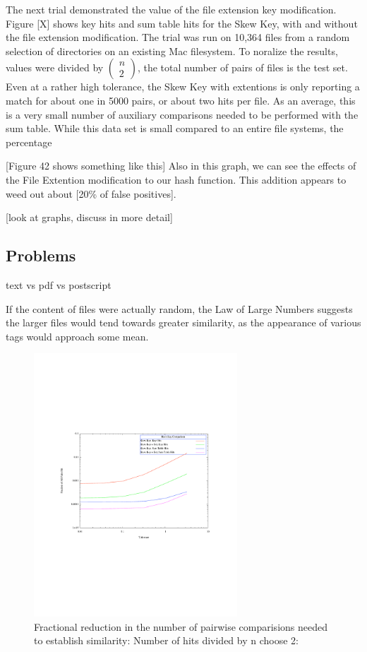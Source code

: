 \documentclass[10pt, twocolumn]{article}
\begin{document}
The next trial demonstrated the value of the file extension key modification.  Figure [X]  shows key hits and sum table hits for the Skew Key, with and without the file extension modification.  The trial was run on 10,364 files from a random selection of directories on an existing Mac filesystem.  To noralize the results, values were divided by $\left( \begin{array}{c} n \\ 2 \end{array} \right)$, the total number of pairs of files is the test set.  Even at a rather high tolerance, the Skew Key with extentions is only reporting a match for about one in 5000 pairs, or about two hits per file.  As an average, this is a very small number of auxiliary comparisons needed to be performed with the sum table.  While this data set is small compared to an entire file systems, the percentage 



 [Figure 42 shows something like this]  Also in this graph, we can see the effects of the File Extention modification to our hash function.  This addition appears to weed out about [20\% of false positives].


[look at graphs, discuss in more detail]




\subsection{Problems}

text vs pdf vs postscript


 If the content of files were actually random, the Law of Large Numbers suggests the larger files would tend towards greater similarity, as the appearance of various tags would approach some mean.  

 \begin{figure}[h] 
 \centering
\includegraphics[width= 3in]{PairwiseElim.pdf}
\caption{Fractional reduction in the number of pairwise comparisions needed to establish similarity: Number of hits divided by n choose 2: }
\label{PairwiseSavings} 
\end{figure}    
\end{document}
